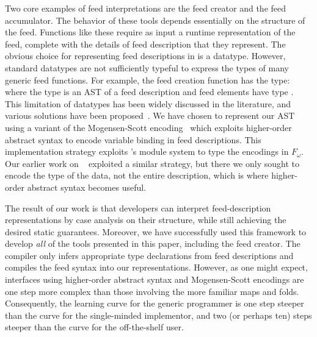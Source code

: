 Two core examples of feed interpretations are the feed creator and the
feed accumulator. The behavior of these tools depends
essentially on the structure of the feed.  Functions like these
require as input a runtime representation of the feed,
complete with the details of feed description that
they represent. The obvious choice for representing feed descriptions
in \ocaml is a datatype. However, standard \ocaml datatypes are not
sufficiently typeful to express the types of many generic feed
functions. For example, the feed creation function has the type:
 
where the type  is an AST of a feed description and feed 
elements have type .
%
%
This limitation of datatypes has been widely discussed in the
literature, and various solutions have been 
proposed~\cite{padsml-padl,xi:popl03,weirich:encodingtypecase,yang:icfp98}. We have 
chosen to represent our AST using a variant of the Mogensen-Scott
encoding~\cite{mogensen:jfp} which exploits higher-order abstract syntax 
to encode variable binding in feed descriptions.  This implementation strategy 
exploits \ocaml's module system to type the encodings in $F_\omega$. 
Our earlier work on \padsml~\cite{padsml-padl} 
exploited a similar strategy,
but there we only sought to encode the \ocaml{} type of the data, not
the entire \padsml{} description, which is where higher-order abstract
syntax becomes useful.


The result of our work is that developers
can interpret feed-description representations by case analysis on
their structure, while still achieving the desired static
guarantees. Moreover, we have successfully used this framework to
develop {\it all} of the tools presented in this paper, including the
feed creator. The compiler only infers appropriate
type declarations from feed descriptions and compiles the feed syntax
into our representations.  However, as one might expect, interfaces using
higher-order abstract syntax and Mogensen-Scott encodings are one step more
complex than those involving the more familiar maps and folds.  Consequently, the
learning curve for the generic programmer is one step steeper than
the curve for the single-minded implementor, and two (or perhaps ten) steps steeper
than the curve for the off-the-shelf user.

